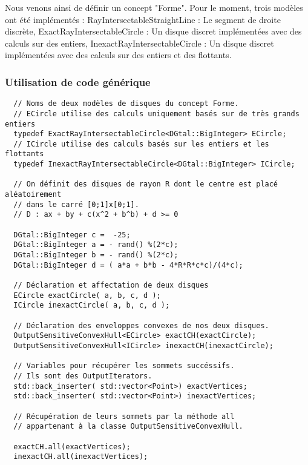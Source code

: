 Nous venons ainsi de définir un concept "Forme". Pour le moment, trois modèles ont été implémentés : RayIntersectableStraightLine : Le segment de droite discrète, ExactRayIntersectableCircle : Un disque discret implémentées avec des calculs sur des entiers, InexactRayIntersectableCircle : Un disque discret implémentées avec des calculs sur des entiers et des flottants.


\subsubsection{Utilisation de code générique}

\begin{verbatim}
  // Noms de deux modèles de disques du concept Forme.
  // ECircle utilise des calculs uniquement basés sur de très grands entiers
  typedef ExactRayIntersectableCircle<DGtal::BigInteger> ECircle;
  // ICircle utilise des calculs basés sur les entiers et les flottants
  typedef InexactRayIntersectableCircle<DGtal::BigInteger> ICircle;
    
  // On définit des disques de rayon R dont le centre est placé aléatoirement
  // dans le carré [0;1]x[0;1].
  // D : ax + by + c(x^2 + b^b) + d >= 0
    
  DGtal::BigInteger c =  -25;
  DGtal::BigInteger a = - rand() %(2*c);
  DGtal::BigInteger b = - rand() %(2*c);  
  DGtal::BigInteger d = ( a*a + b*b - 4*R*R*c*c)/(4*c);
  
  // Déclaration et affectation de deux disques
  ECircle exactCircle( a, b, c, d );	
  ICircle inexactCircle( a, b, c, d );	  
  
  // Déclaration des enveloppes convexes de nos deux disques.
  OutputSensitiveConvexHull<ECircle> exactCH(exactCircle);
  OutputSensitiveConvexHull<ICircle> inexactCH(inexactCircle);
  
  // Variables pour récupérer les sommets succéssifs.
  // Ils sont des OutputIterators.
  std::back_inserter( std::vector<Point>) exactVertices;
  std::back_inserter( std::vector<Point>) inexactVertices;
  
  // Récupération de leurs sommets par la méthode all 
  // appartenant à la classe OutputSensitiveConvexHull.

  exactCH.all(exactVertices);  
  inexactCH.all(inexactVertices); 
\end{verbatim}

